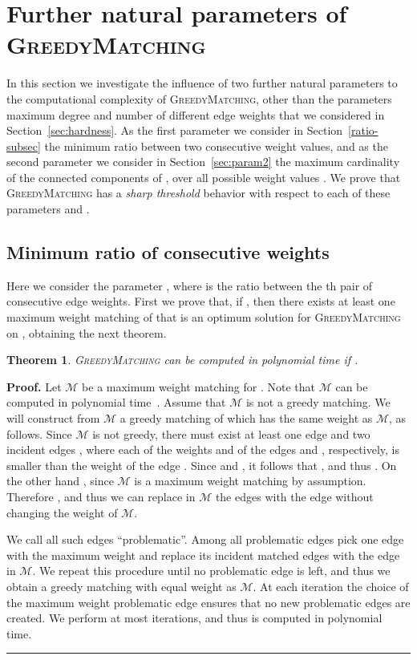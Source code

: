 \documentclass[a4paper,11pt]{article}
\newtheorem{theorem}{Theorem}
\newenvironment{proof}[1][Proof]{\noindent\textbf{#1.} }{\ \rule{0.5em}{0.5em}}
\newcommand{\mcal}{\ensuremath{\mathcal{M}}\xspace}
\newcommand{\greedy}{\textsc{GreedyMatching}\xspace}
\begin{document}
\section{Further natural parameters of \textsc{GreedyMatching}}

In this section we investigate the influence of two further natural parameters to the computational complexity of \greedy, 
other than the parameters maximum degree and number of different edge weights that we considered in Section~\ref{sec:hardness}. 
As the first parameter we consider in Section~\ref{ratio-subsec} the minimum ratio  
between two consecutive weight values, and as the second parameter we consider in Section~\ref{sec:param2} 
the maximum cardinality  of the connected components of , over all possible weight values . 
We prove that \greedy has a \emph{sharp threshold} behavior with respect to each of these parameters  and .

\subsection{Minimum ratio of consecutive weights\label{ratio-subsec}}

Here we consider the parameter , 
where  is the ratio between the th pair of consecutive edge weights. 
First we prove that, if , then there exists at least one 
maximum weight matching of  that is an optimum solution for \greedy on 
, obtaining the next theorem.

\begin{theorem}
\label{thm:rg2} \greedy can be computed in polynomial time if .
\end{theorem}

\begin{proof}
Let \mcal be a maximum weight matching for . Note that \mcal can be computed 
in polynomial time~\cite{Duan14}. Assume
that \mcal is not a greedy matching. We will construct from \mcal a greedy 
matching of  which has the same weight as \mcal, as follows. Since \mcal is 
not greedy, there must exist at least one edge  and two
incident edges ,
where each of the weights  and  of
the edges  and , respectively, is smaller
than the weight  of the edge . Since  and , it follows that , and thus . On the other hand , since \mcal is a
maximum weight matching by assumption. Therefore , and thus we can replace in \mcal the
edges  with the edge  without changing
the weight of \mcal.

We call all such edges  ``problematic''. Among
all problematic edges pick one edge  with the maximum weight and replace
its incident matched edges  with the edge 
in \mcal. We repeat this procedure until no problematic edge
is left, and thus we obtain a greedy matching  with
equal weight as \mcal. 
At each iteration the choice of the maximum weight problematic edge ensures
that no new problematic edges are created. We perform at most  iterations, and thus  is computed
in polynomial time.
\end{proof}
\end{document}
